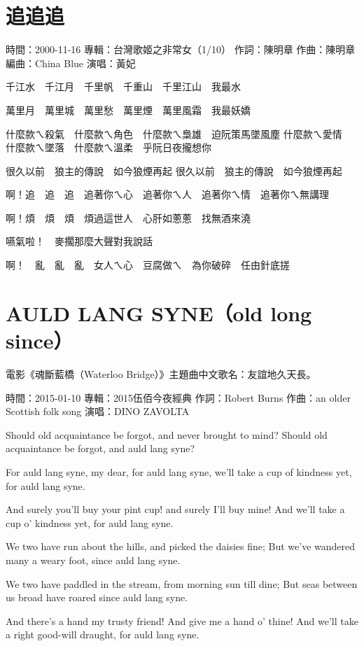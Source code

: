 \documentclass[UTF8,a4paper,oneside,twocolumn,12pt]{ctexbook}
\newcommand{\infopair}[2]{\textbullet #1：#2}
\newcommand{\zc}[1][伍佰]{\infopair{作詞}{#1}}
\newcommand{\zq}[1][伍佰]{\infopair{作曲}{#1}}
\newcommand{\bq}[1][伍佰]{\infopair{編曲}{#1}}
\newcommand{\zj}[1]{\infopair{專輯}{#1}}
\newcommand{\sj}[1]{\infopair{時間}{#1}}
\newenvironment{info}{\begin{flushleft}\kaishu
	}
	{\end{flushleft}\normalsize\yahei\par}
\newenvironment{lyric}{
	}
{}
\begin{document}
\section{追追追}
\begin{info}
	\sj{2000-11-16}
	\zj{台灣歌姬之非常女（1/10）}
	\zc[陳明章]
	\zq[陳明章]
	\bq[China Blue]
	\infopair{演唱}{黃妃}
\end{info}
\begin{lyric}
	千江水　千江月　千里帆　千重山　千里江山　我最水

	萬里月　萬里城　萬里愁　萬里煙　萬里風霜　我最妖嬌

	什麼款ㄟ殺氣　什麼款ㄟ角色　什麼款ㄟ梟雄　迫阮策馬墜風塵
	什麼款ㄟ愛情　什麼款ㄟ墜落　什麼款ㄟ溫柔　乎阮日夜攏想你

	很久以前　狼主的傳說　如今狼煙再起
	很久以前　狼主的傳說　如今狼煙再起

	啊！追　追　追　追著你ㄟ心　追著你ㄟ人　追著你ㄟ情　追著你ㄟ無講理

	啊！煩　煩　煩　煩過這世人　心肝如蔥蔥　找無酒來澆

	嚥氣啦！　麥擱那麼大聲對我說話

	啊！　亂　亂　亂　女人ㄟ心　豆腐做ㄟ　為你破碎　任由針底搓
\end{lyric}

\section{AULD LANG SYNE（old long since）}
\begin{info}

	電影《魂斷藍橋（Waterloo Bridge）》主題曲中文歌名：友誼地久天長。

	\sj{2015-01-10}
	\zj{2015伍佰今夜經典}
	\zc[Robert Burns]
	\zq[an older Scottish folk song]
	\infopair{演唱}{DINO ZAVOLTA}
\end{info}
\begin{lyric}
	Should old acquaintance be forgot,
	and never brought to mind?
	Should old acquaintance be forgot,
	and auld lang syne?

	For auld lang syne, my dear,
	for auld lang syne,
	we'll take a cup of kindness yet,
	for auld lang syne.

	And surely you'll buy your pint cup!
	and surely I'll buy mine!
	And we'll take a cup o' kindness yet,
	for auld lang syne.

	We two have run about the hills,
	and picked the daisies fine;
	But we've wandered many a weary foot,
	since auld lang syne.

	We two have paddled in the stream,
	from morning sun till dine;
	But seas between us broad have roared
	since auld lang syne.

	And there's a hand my trusty friend!
	And give me a hand o' thine!
	And we'll take a right good-will draught,
	for auld lang syne.
\end{lyric}
\end{document}
